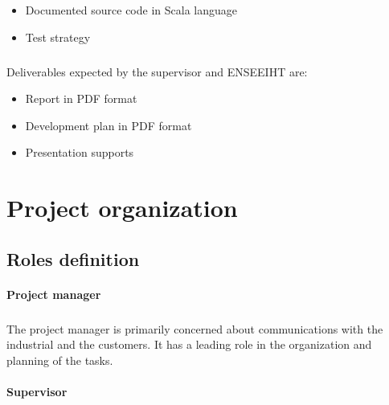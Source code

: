 \documentclass{report}
\begin{document}
\vspace{4mm}
\begin{itemize}
\item Documented source code in Scala language\vspace{1mm}
\item Test strategy\vspace{1mm}
\end{itemize}

\paragraph{}
\hspace{4mm}\textnormal{Deliverables expected by the supervisor and ENSEEIHT are:}

\vspace{4mm}
\begin{itemize}
\item Report in PDF format\vspace{1mm}
\item Development plan in PDF format\vspace{1mm}
\item Presentation supports\vspace{1mm}
\end{itemize}

\chapter{Project organization}

\section{Roles definition}

\subsubsection{Project manager}

\paragraph{}
\hspace{4mm}\textnormal{The project manager is primarily concerned about communications with the industrial and the customers. It has a leading role in the organization and planning of the tasks.}

\subsubsection{Supervisor}
\end{document}
